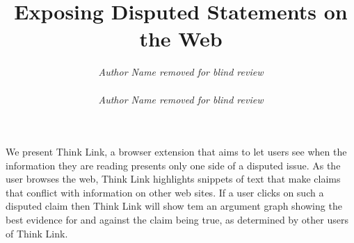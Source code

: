 \documentclass{chi2009}
\begin{document}

\toappear{}



\title{Exposing Disputed Statements on the Web}


\author{
\parbox[t]{9cm}{\centering
	     {\em Author Name removed for blind review}\\
}
\parbox[t]{9cm}{\centering
	     {\em Author Name removed for blind review}}
}

\maketitle


\abstract
We present Think Link, a browser extension that aims to let users see when the information they are reading presents only one side of a disputed issue. As the user browses the web, Think Link highlights snippets of text that make claims that conflict with information on other web sites. If a user clicks on such a disputed claim then Think Link will show tem an argument graph showing the best evidence for and against the claim being true, as determined by other users of Think Link.




\end{document}
